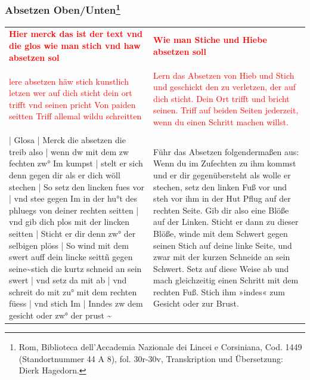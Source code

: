 \newpage

\begin{center}
\end{center}
\newpage

\subsubsection[Absetzen Oben/Unten]{Absetzen Oben/Unten\footnote{\hspace*{0.5ex}Rom, Biblioteca dell'Accademia Nazionale dei Lincei e Corsiniana, Cod. 1449 (Standortnummer 44 A 8), fol. 30r-30v, Transkription und Übersetzung: Dierk Hagedorn.}}

\begin{longtable}{p{6.25cm}p{6.25cm}}
\textbf{\textcolor{red}{Hier merck das ist der text vnd die glos wie man stich vnd haw absetzen sol}}
&
\textbf{\textcolor{red}{Wie man Stiche und Hiebe absetzen soll}}
\\
\\
\textcolor{red}{lere absetzen häw stich kunstlich letzen wer auf dich sticht dein ort trifft vnd seinen pricht Von paiden seitten Triff allemal wildu schreitten}
&
\textcolor{red}{Lern das Absetzen von Hieb und Stich und geschickt den zu verletzen, der auf dich sticht. Dein Ort trifft und bricht seinen. Triff auf beiden Seiten jederzeit, wenn du einen Schritt machen willst.}
\\
\\
| Glosa | Merck die absetzen die treib also | wenn dw mit dem zw fechten zw° Im kumpst | stelt er sich denn gegen dir als er dich wöll stechen | So setz den lincken fues vor | vnd stee gegen Im in der hu°t des phluegs von deiner rechten seitten | vnd gib dich plos mit der lincken seitten | Sticht er dir denn zw° der selbigen plöss | So wind mit dem swert auff dein lincke seittñ gegen seine\textasciitilde  stich die kurtz schneid an sein swert | vnd setz da mit ab | vnd schreit do mit zu° mit dem rechten füess | vnd stich Im | Inndes zw dem gesicht oder zw° der prust \textasciitilde 
&
Führ das Absetzen folgendermaßen aus: Wenn du im Zufechten zu ihm kommst und er dir gegenübersteht als wolle er stechen, setz den linken Fuß vor und steh vor ihm in der Hut Pflug auf der rechten Seite. Gib dir also eine Blöße auf der Linken. Sticht er dann zu dieser Blöße, winde mit dem Schwert gegen seinen Stich auf deine linke Seite, und zwar mit der kurzen Schneide an sein Schwert. Setz auf diese Weise ab und mach gleichzeitig einen Schritt mit dem rechten Fuß. Stich ihm »indes« zum Gesicht oder zur Brust.

\end{longtable}
